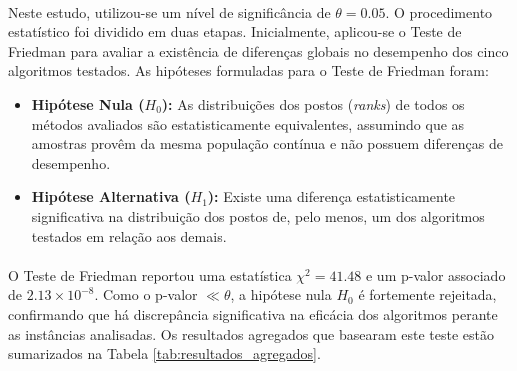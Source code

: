 \paragraph{} Neste estudo, utilizou-se um nível de significância de $\theta = 0.05$. O procedimento estatístico foi dividido em duas etapas. Inicialmente, aplicou-se o Teste de Friedman para avaliar a existência de diferenças globais no desempenho dos cinco algoritmos testados. As hipóteses formuladas para o Teste de Friedman foram:

\begin{itemize}
    \item \textbf{Hipótese Nula ($H_0$):} As distribuições dos postos (\textit{ranks}) de todos os métodos avaliados são estatisticamente equivalentes, assumindo que as amostras provêm da mesma população contínua e não possuem diferenças de desempenho.
    \item \textbf{Hipótese Alternativa ($H_1$):} Existe uma diferença estatisticamente significativa na distribuição dos postos de, pelo menos, um dos algoritmos testados em relação aos demais.
\end{itemize}

\paragraph{} O Teste de Friedman reportou uma estatística $\chi^2 = 41.48$ e um p-valor associado de $2.13 \times 10^{-8}$. Como o p-valor $\ll \theta$, a hipótese nula $H_0$ é fortemente rejeitada, confirmando que há discrepância significativa na eficácia dos algoritmos perante as instâncias analisadas. Os resultados agregados que basearam este teste estão sumarizados na Tabela \ref{tab:resultados_agregados}.

